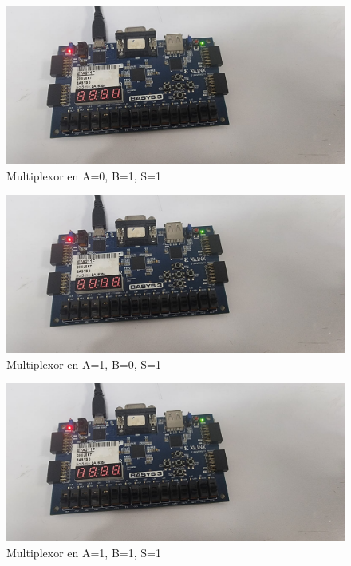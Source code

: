 \documentclass[12pt]{article}  %
\begin{document}
\begin{figure}[!ht]
    \centering
    \caption{Multiplexor en A=0, B=1, S=1}
    \includegraphics[width=1\linewidth]{simulations/multiplex/multiplex1.jpg}
\end{figure}
\begin{figure}[!ht]
    \centering
    \caption{Multiplexor en A=1, B=0, S=1}
    \includegraphics[width=1\linewidth]{simulations/multiplex/multiplex1.jpg}
\end{figure}
\newpage

\begin{figure}[!ht]
    \centering
    \caption{Multiplexor en A=1, B=1, S=1}
    \includegraphics[width=1\linewidth]{simulations/multiplex/multiplex1.jpg}
\end{figure}
\newpage
\end{document}
